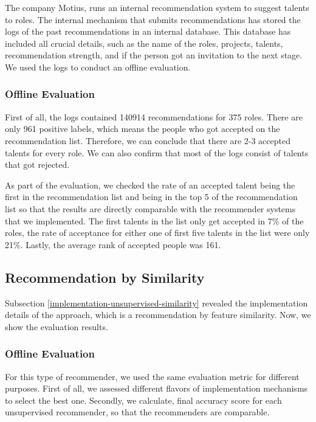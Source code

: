 The company Motius, runs an internal recommendation system to suggest talents to roles. The internal mechanism that submits recommendations has stored the logs of the past recommendations in an internal database. This database has included all crucial details, such as the name of the roles, projects, talents, recommendation strength, and if the person got an invitation to the next stage. We used the logs to conduct an offline evaluation.

\subsubsection{Offline Evaluation}

First of all, the logs contained 140914 recommendations for 375 roles. There are only 961 positive labels, which means the people who got accepted on the recommendation list. Therefore, we can conclude that there are 2-3 accepted talents for every role. We can also confirm that most of the logs consist of talents that got rejected. 

As part of the evaluation, we checked the rate of an accepted talent being the first in the recommendation list and being in the top 5 of the recommendation list so that the results are directly comparable with the recommender systems that we implemented. The first talents in the list only get accepted in 7\% of the roles, the rate of acceptance for either one of first five talents in the list were only 21\%. Lastly, the average rank of accepted people was 161. 

\subsection{Recommendation by Similarity}\label{ev-rec-sim}

Subsection \ref{implementation-unsupervised-similarity} revealed the implementation details of the approach, which is a recommendation by feature similarity. Now, we show the evaluation results. 

\subsubsection{Offline Evaluation}

For this type of recommender, we used the same evaluation metric for different purposes. First of all, we assessed different flavors of implementation mechanisms to select the best one. Secondly, we calculate, final accuracy score for each unsupervised recommender, so that the recommenders are comparable.

